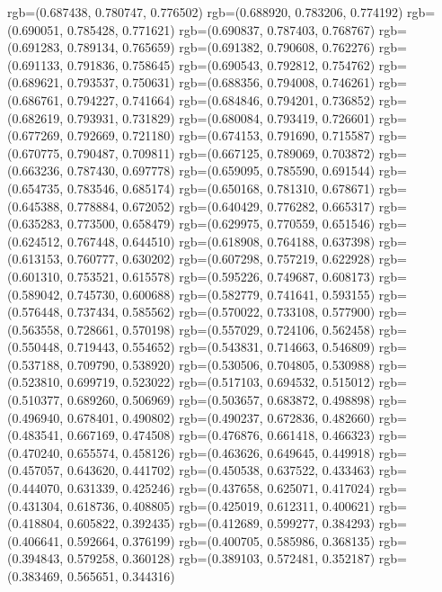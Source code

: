 {{{					rgb=(0.687438, 0.780747, 0.776502)
					rgb=(0.688920, 0.783206, 0.774192)
					rgb=(0.690051, 0.785428, 0.771621)
					rgb=(0.690837, 0.787403, 0.768767)
					rgb=(0.691283, 0.789134, 0.765659)
					rgb=(0.691382, 0.790608, 0.762276)
					rgb=(0.691133, 0.791836, 0.758645)
					rgb=(0.690543, 0.792812, 0.754762)
					rgb=(0.689621, 0.793537, 0.750631)
					rgb=(0.688356, 0.794008, 0.746261)
					rgb=(0.686761, 0.794227, 0.741664)
					rgb=(0.684846, 0.794201, 0.736852)
					rgb=(0.682619, 0.793931, 0.731829)
					rgb=(0.680084, 0.793419, 0.726601)
					rgb=(0.677269, 0.792669, 0.721180)
					rgb=(0.674153, 0.791690, 0.715587)
					rgb=(0.670775, 0.790487, 0.709811)
					rgb=(0.667125, 0.789069, 0.703872)
					rgb=(0.663236, 0.787430, 0.697778)
					rgb=(0.659095, 0.785590, 0.691544)
					rgb=(0.654735, 0.783546, 0.685174)
					rgb=(0.650168, 0.781310, 0.678671)
					rgb=(0.645388, 0.778884, 0.672052)
					rgb=(0.640429, 0.776282, 0.665317)
					rgb=(0.635283, 0.773500, 0.658479)
					rgb=(0.629975, 0.770559, 0.651546)
					rgb=(0.624512, 0.767448, 0.644510)
					rgb=(0.618908, 0.764188, 0.637398)
					rgb=(0.613153, 0.760777, 0.630202)
					rgb=(0.607298, 0.757219, 0.622928)
					rgb=(0.601310, 0.753521, 0.615578)
					rgb=(0.595226, 0.749687, 0.608173)
					rgb=(0.589042, 0.745730, 0.600688)
					rgb=(0.582779, 0.741641, 0.593155)
					rgb=(0.576448, 0.737434, 0.585562)
					rgb=(0.570022, 0.733108, 0.577900)
					rgb=(0.563558, 0.728661, 0.570198)
					rgb=(0.557029, 0.724106, 0.562458)
					rgb=(0.550448, 0.719443, 0.554652)
					rgb=(0.543831, 0.714663, 0.546809)
					rgb=(0.537188, 0.709790, 0.538920)
					rgb=(0.530506, 0.704805, 0.530988)
					rgb=(0.523810, 0.699719, 0.523022)
					rgb=(0.517103, 0.694532, 0.515012)
					rgb=(0.510377, 0.689260, 0.506969)
					rgb=(0.503657, 0.683872, 0.498898)
					rgb=(0.496940, 0.678401, 0.490802)
					rgb=(0.490237, 0.672836, 0.482660)
					rgb=(0.483541, 0.667169, 0.474508)
					rgb=(0.476876, 0.661418, 0.466323)
					rgb=(0.470240, 0.655574, 0.458126)
					rgb=(0.463626, 0.649645, 0.449918)
					rgb=(0.457057, 0.643620, 0.441702)
					rgb=(0.450538, 0.637522, 0.433463)
					rgb=(0.444070, 0.631339, 0.425246)
					rgb=(0.437658, 0.625071, 0.417024)
					rgb=(0.431304, 0.618736, 0.408805)
					rgb=(0.425019, 0.612311, 0.400621)
					rgb=(0.418804, 0.605822, 0.392435)
					rgb=(0.412689, 0.599277, 0.384293)
					rgb=(0.406641, 0.592664, 0.376199)
					rgb=(0.400705, 0.585986, 0.368135)
					rgb=(0.394843, 0.579258, 0.360128)
					rgb=(0.389103, 0.572481, 0.352187)
					rgb=(0.383469, 0.565651, 0.344316)
}}}
